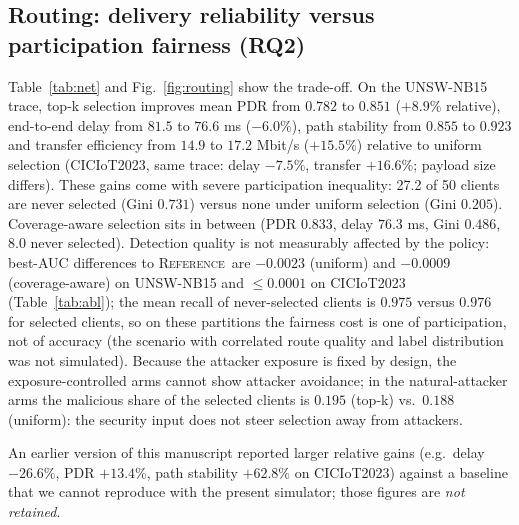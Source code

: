 \documentclass[preprint,12pt,times,numafflabel]{elsarticle}
\newcommand{\RefA}{\textsc{Reference}}
\begin{document}
\subsection{Routing: delivery reliability versus participation fairness (RQ2)}
\begin{table}[t]\centering\scriptsize
\caption{Network, delivery and participation by policy (means over 5 seeds). PDR = fraction of packets received at first transmission; Received/sel.\ = updates reaching the server per selected client (includes explicit failures); Gini over selection counts; Never sel.\ = clients (of 50) never selected in 30 rounds. Source: \texttt{ledger\_network\_fairness\_per\_run\_phase6c.csv}.}\label{tab:net}
\resizebox{\textwidth}{!}{}
\end{table}
Table~\ref{tab:net} and Fig.~\ref{fig:routing} show the trade-off. On the UNSW-NB15 trace, top-k selection improves mean PDR from $0.782$ to $0.851$ ($+8.9\%$ relative), end-to-end delay from $81.5$ to $76.6$ ms ($-6.0\%$), path stability from $0.855$ to $0.923$ and transfer efficiency from $14.9$ to $17.2$ Mbit/s ($+15.5\%$) relative to uniform selection (CICIoT2023, same trace: delay $-7.5\%$, transfer $+16.6\%$; payload size differs). These gains come with severe participation inequality: 27.2 of 50 clients are never selected (Gini $0.731$) versus none under uniform selection (Gini $0.205$). Coverage-aware selection sits in between (PDR $0.833$, delay $76.3$ ms, Gini $0.486$, 8.0 never selected). Detection quality is not measurably affected by the policy: best-AUC differences to \RefA\ are $-0.0023$ (uniform) and $-0.0009$ (coverage-aware) on UNSW-NB15 and $\le0.0001$ on CICIoT2023 (Table~\ref{tab:abl}); the mean recall of never-selected clients is $0.975$ versus $0.976$ for selected clients, so on these partitions the fairness cost is one of participation, not of accuracy (the scenario with correlated route quality and label distribution was not simulated). Because the attacker exposure is fixed by design, the exposure-controlled arms cannot show attacker avoidance; in the natural-attacker arms the malicious share of the selected clients is $0.195$ (top-k) vs.\ $0.188$ (uniform): the security input does not steer selection away from attackers.

An earlier version of this manuscript reported larger relative gains (e.g.\ delay $-26.6\%$, PDR $+13.4\%$, path stability $+62.8\%$ on CICIoT2023) against a baseline that we cannot reproduce with the present simulator; those figures are \emph{not retained}.
\end{document}
